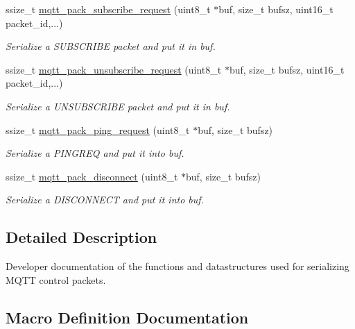 \begin{DoxyCompactItemize}
ssize\+\_\+t \hyperlink{group__packers_ga65a198063d780e654af0336e5088f609}{mqtt\+\_\+pack\+\_\+subscribe\+\_\+request} (uint8\+\_\+t $\ast$buf, size\+\_\+t bufsz, uint16\+\_\+t packet\+\_\+id,...)
\begin{DoxyCompactList}\small\item\em Serialize a S\+U\+B\+S\+C\+R\+I\+BE packet and put it in {\ttfamily buf}. \end{DoxyCompactList}\item 
ssize\+\_\+t \hyperlink{group__packers_ga3a0e5c05084d708f16cb1a244cbcaad5}{mqtt\+\_\+pack\+\_\+unsubscribe\+\_\+request} (uint8\+\_\+t $\ast$buf, size\+\_\+t bufsz, uint16\+\_\+t packet\+\_\+id,...)
\begin{DoxyCompactList}\small\item\em Serialize a U\+N\+S\+U\+B\+S\+C\+R\+I\+BE packet and put it in {\ttfamily buf}. \end{DoxyCompactList}\item 
ssize\+\_\+t \hyperlink{group__packers_gac11b5cc5c6bbbf386c2515c823965a82}{mqtt\+\_\+pack\+\_\+ping\+\_\+request} (uint8\+\_\+t $\ast$buf, size\+\_\+t bufsz)
\begin{DoxyCompactList}\small\item\em Serialize a P\+I\+N\+G\+R\+EQ and put it into {\ttfamily buf}. \end{DoxyCompactList}\item 
ssize\+\_\+t \hyperlink{group__packers_ga7842c85a0711df31f2e9ce31a9253999}{mqtt\+\_\+pack\+\_\+disconnect} (uint8\+\_\+t $\ast$buf, size\+\_\+t bufsz)
\begin{DoxyCompactList}\small\item\em Serialize a D\+I\+S\+C\+O\+N\+N\+E\+CT and put it into {\ttfamily buf}. \end{DoxyCompactList}\end{DoxyCompactItemize}


\subsection{Detailed Description}
Developer documentation of the functions and datastructures used for serializing M\+Q\+TT control packets. 



\subsection{Macro Definition Documentation}
